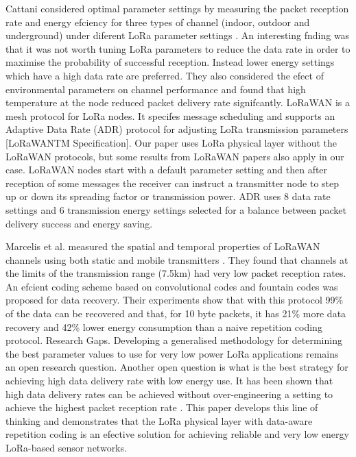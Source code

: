 Cattani considered optimal parameter settings by measuring the packet reception rate and energy efciency for three types of channel (indoor,
	outdoor and underground) under diferent LoRa parameter settings \cite{marco_cattani_experimental_2017}.
An interesting fnding was that it was not worth tuning LoRa parameters to reduce the data rate in order to maximise the probability of successful reception.
Instead lower energy settings which have a high data rate are preferred.
They also considered the efect of environmental parameters on channel performance and found that high temperature at the node reduced packet delivery rate signifcantly.
LoRaWAN is a mesh protocol for LoRa nodes.
It specifes message scheduling and supports an Adaptive Data Rate (ADR) protocol for adjusting LoRa transmission parameters [LoRaWANTM Specification].
Our paper uses LoRa physical layer without the LoRaWAN protocols,
	but some results from LoRaWAN papers also apply in our case.
LoRaWAN nodes start with a default parameter setting and then after reception of some messages the receiver can instruct a transmitter node to step up or down its spreading factor or transmission power.
ADR uses 8 data rate settings and 6 transmission energy settings selected for a balance between packet delivery success and energy saving.

Marcelis et al.
measured the spatial and temporal properties of LoRaWAN channels using both static and mobile transmitters \cite{marcelis_dare_2017}.
They found that channels at the limits of the transmission range (7.5km) had very low packet reception rates.
An efcient coding scheme based on convolutional codes and fountain codes was proposed for data recovery.
Their experiments show that with this protocol 99\% of the data can be recovered and that,
for 10 byte packets,
	it has 21\% more data recovery and 42\% lower energy
consumption than a naive repetition coding protocol.
Research Gaps.
Developing a generalised methodology for determining the best parameter values to use for very low power LoRa applications remains an open research question.
Another open question is what is the best strategy for achieving high data delivery rate with low energy use.
It has been shown that high data delivery rates can be achieved without over-engineering a setting to achieve the highest packet reception rate \cite{marco_cattani_experimental_2017}\cite{marcelis_dare_2017}.
This paper develops this line of thinking and demonstrates that the LoRa physical layer with data-aware repetition coding is an efective solution for achieving reliable and very low energy LoRa-based sensor networks.

